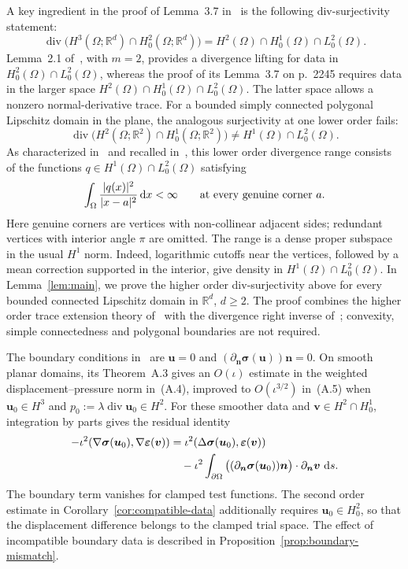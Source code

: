 \documentclass[10pt]{amsart}
\newcommand{\dx}{\,{\rm d}x}
\newcommand{\dd}{\,{\rm d}}
\renewcommand{\div}{\operatorname{div}}
\numberwithin{equation}{section}
\begin{document}
A key ingredient in the proof of Lemma~3.7 in~\cite{ChenHuangHuang2023} is the following div-surjectivity statement:
\[
\div\big( H^3(\Omega;\mathbb R^d)\cap H_0^2(\Omega;\mathbb R^d)\big)
= H^2(\Omega)\cap H_0^1(\Omega)\cap L_0^2(\Omega).
\]
Lemma~2.1 of~\cite[p.~2240]{ChenHuangHuang2023}, with $m=2$, provides a divergence lifting for data in $H_0^2(\Omega)\cap L_0^2(\Omega)$, whereas the proof of its Lemma~3.7 on p.~2245 requires data in the larger space $H^2(\Omega)\cap H_0^1(\Omega)\cap L_0^2(\Omega)$. The latter space allows a nonzero normal-derivative trace. For a bounded simply connected polygonal Lipschitz domain in the plane, the analogous surjectivity at one lower order fails:
\[
\div\big( H^2(\Omega;\mathbb R^2)\cap H_0^1(\Omega;\mathbb R^2)\big)
\neq H^1(\Omega)\cap L_0^2(\Omega).
\]
As characterized in~\cite[Theorem~3.1]{ArnoldScottVogelius1988} and recalled in~\cite[Section~3.1 and Lemma~3.2]{LiaoMing2025}, this lower order divergence range consists of the functions $q\in H^1(\Omega)\cap L_0^2(\Omega)$ satisfying
\[
\int_\Omega \frac{|q(x)|^2}{|x-a|^2}\dx<\infty
\qquad\text{at every genuine corner }a.
\]
Here genuine corners are vertices with non-collinear adjacent sides; redundant vertices with interior angle $\pi$ are omitted. The range is a dense proper subspace in the usual $H^1$ norm. Indeed, logarithmic cutoffs near the vertices, followed by a mean correction supported in the interior, give density in $H^1(\Omega)\cap L_0^2(\Omega)$. In Lemma~\ref{lem:main}, we prove the higher order div-surjectivity above for every bounded connected Lipschitz domain in $\mathbb R^d$, $d\geq2$. The proof combines the higher order trace extension theory of~\cite{MazyaMitreaShaposhnikova2010} with the divergence right inverse of~\cite{CostabelMcIntosh2010}; convexity, simple connectedness and polygonal boundaries are not required.

The boundary conditions in~\cite{LiaoMing2025} are $\boldsymbol u=0$ and $(\partial_{\boldsymbol n}\boldsymbol\sigma(\boldsymbol u))\boldsymbol n=0$. On smooth planar domains, its Theorem~A.3 gives an $O(\iota)$ estimate in the weighted displacement--pressure norm in~(A.4), improved to $O(\iota^{3/2})$ in~(A.5) when $\boldsymbol u_0\in H^3$ and $p_0:=\lambda\div\boldsymbol u_0\in H^2$. For these smoother data and $\boldsymbol v\in H^2\cap H_0^1$, integration by parts gives the residual identity
\[
\begin{aligned}
-\iota^2(\nabla\boldsymbol\sigma(\boldsymbol u_0),\nabla\boldsymbol\varepsilon(\boldsymbol v))
&=\iota^2(\Delta\boldsymbol\sigma(\boldsymbol u_0),\boldsymbol\varepsilon(\boldsymbol v))\\
&\quad-\iota^2\int_{\partial\Omega}
\big((\partial_{\boldsymbol n}\boldsymbol\sigma(\boldsymbol u_0))\boldsymbol n\big)\cdot\partial_{\boldsymbol n}\boldsymbol v\,\dd s.
\end{aligned}
\]
The boundary term vanishes for clamped test functions. The second order estimate in Corollary~\ref{cor:compatible-data} additionally requires $\boldsymbol u_0\in H_0^2$, so that the displacement difference belongs to the clamped trial space. The effect of incompatible boundary data is described in Proposition~\ref{prop:boundary-mismatch}.
\end{document}
